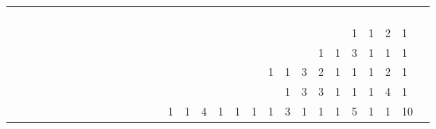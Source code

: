 \begin{tabular}{|p{\cellsize}|p{\cellsize}|p{\cellsize}|p{\cellsize}|p{\cellsize}|p{\cellsize}|p{\cellsize}|p{\cellsize}|p{\cellsize}|p{\cellsize}|p{\cellsize}|p{\cellsize}|p{\cellsize}|p{\cellsize}|p{\cellsize}|p{\cellsize}|p{\cellsize}|p{\cellsize}|p{\cellsize}|p{\cellsize}|p{\cellsize}|p{\cellsize}|p{\cellsize}|p{\cellsize}|p{\cellsize}|p{\cellsize}|p{\cellsize}|p{\cellsize}|p{\cellsize}|p{\cellsize}|}
 & & & & & & & & & & & & & & & & & & & & & & & & & & & & &  \\ \hline
 & & & & & & & & & & & & & & & & & & & & & & & & & & & & &  \\ \hline
 & & & & & & & & & & & & & & & & & & & & & & & & & & & & &  \\ \hline
 & & & & & & & & & & & & & & & & & & & & & & & & & & & & &  \\ \hline
 & & & & & & & & & & & & & & & & & & & & & & & & & & & & &  \\ \hline
 & & & & & & & & & & & & & & & & & & & & & & & & & \cellcolor[RGB]{204,204,204}1&\cellcolor[RGB]{127,127,127}1&\cellcolor[RGB]{102,102,102}2&\cellcolor[RGB]{204,204,204}1 \\ \hline
 & & & & & & & & & & & & & & & & & & & & & & & \cellcolor[RGB]{229,229,229}1&\cellcolor[RGB]{127,127,127}1&\cellcolor[RGB]{76,76,76}3&\cellcolor[RGB]{51,51,51}1&\cellcolor[RGB]{178,178,178}1&\cellcolor[RGB]{229,229,229}1 \\ \hline
 & & & & & & & & & & & & & & & & & & & & \cellcolor[RGB]{178,178,178}1&\cellcolor[RGB]{102,102,102}1&\cellcolor[RGB]{76,76,76}3&\cellcolor[RGB]{51,51,51}2&\cellcolor[RGB]{204,204,204}1&\cellcolor[RGB]{178,178,178}1&\cellcolor[RGB]{127,127,127}1&\cellcolor[RGB]{102,102,102}2&\cellcolor[RGB]{204,204,204}1 \\ \hline
 & & & & & & & & & & & & & & & & & & & & & \cellcolor[RGB]{204,204,204}1&\cellcolor[RGB]{76,76,76}3&\cellcolor[RGB]{51,51,51}3&\cellcolor[RGB]{127,127,127}1&\cellcolor[RGB]{153,153,153}1&\cellcolor[RGB]{127,127,127}1&\cellcolor[RGB]{76,76,76}4&\cellcolor[RGB]{204,204,204}1 \\ \hline
 & & & & & & & & & & & & & & \cellcolor[RGB]{102,102,102}1&\cellcolor[RGB]{76,76,76}1&\cellcolor[RGB]{51,51,51}4&\cellcolor[RGB]{25,25,25}1&\cellcolor[RGB]{229,229,229}1&\cellcolor[RGB]{229,229,229}1&\cellcolor[RGB]{204,204,204}1&\cellcolor[RGB]{178,178,178}3&\cellcolor[RGB]{204,204,204}1&\cellcolor[RGB]{229,229,229}1&\cellcolor[RGB]{204,204,204}1&\cellcolor[RGB]{76,76,76}5&\cellcolor[RGB]{51,51,51}1&\cellcolor[RGB]{102,102,102}1&\cellcolor[RGB]{229,229,229}10 \\ \hline

\end{tabular}
